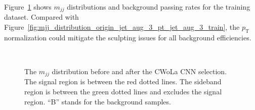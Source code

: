 \documentclass[12pt]{article}
\begin{document}
			Figure~\ref{fig:mjj_distribution_pt_normalized_origin_train} shows $m_{jj}$ distributions and background passing rates for the training dataset. Compared with Figure~\ref{fig:mjj_distribution_origin_jet_aug_3_pt_jet_aug_3_train}, the $p_{\text{T}}$ normalization could mitigate the sculpting issues for all background efficiencies.
			\begin{figure}[htpb]
				\centering
				 \\
				\caption{The $m_{jj}$ distribution before and after the CWoLa CNN selection. The signal region is between the red dotted lines. The sideband region is between the green dotted lines and excludes the signal region. ``B'' stands for the background samples.}
				\label{fig:mjj_distribution_pt_normalized_origin_train}
			\end{figure}
\end{document}

